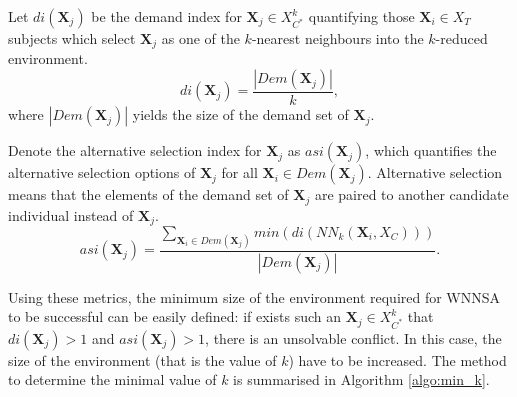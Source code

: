 		Let $di(\textbf{X}_j)$ be the demand index for $\textbf{X}_j \in X_{C^*}^{k}$ quantifying those $\textbf{X}_i \in X_T$ subjects which select $\textbf{X}_j$ as one of the $k$-nearest neighbours into the $k$-reduced environment.				
		\begin{equation}
			di(\textbf{X}_j) = \frac{|Dem(\textbf{X}_j)|}{k},
			\label{eq:di}
		\end{equation}
		where $|Dem(\textbf{X}_j)|$ yields the size of the demand set of $\textbf{X}_j$.
										
		Denote the alternative selection index for $\textbf{X}_j$ as $asi(\textbf{X}_j)$, which quantifies the alternative selection options of $\textbf{X}_j$ for all $\textbf{X}_i \in Dem(\textbf{X}_j)$. Alternative selection means that the elements of the demand set of $\textbf{X}_j$ are paired to another candidate individual instead of $\textbf{X}_j$.				
		\begin{equation}
			asi(\textbf{X}_j) = \frac{\sum_{\textbf{X}_i \in Dem(\textbf{X}_j)} min (di(NN_k(\textbf{X}_i, X_C))) }{|Dem(\textbf{X}_j)|}.
			\label{eq:asi}
		\end{equation}
										
		Using these metrics, the minimum size of the environment required for WNNSA to be successful can be easily defined: if exists such an $ \textbf{X}_j \in X_{C^*}^k$ that $di(\textbf{X}_j)>1$ and $asi(\textbf{X}_j)>1$, there is an unsolvable conflict. In this case, the size of the environment (that is the value of $k$) have to be increased. The method to determine the minimal value of $k$ is summarised in Algorithm \ref{algo:min_k}.
										
